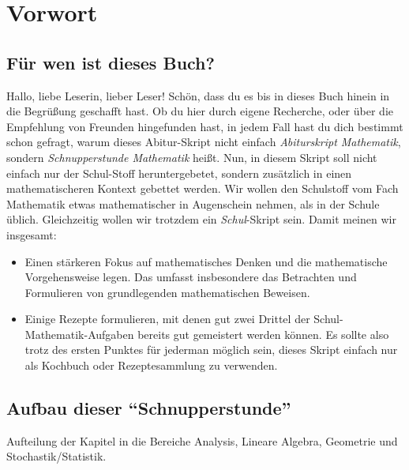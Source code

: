\chapter{Vorwort}

\section{Für wen ist dieses Buch?}
Hallo, liebe Leserin, lieber Leser! Schön, dass du es bis in dieses Buch hinein in die Begrüßung geschafft hast. Ob du hier durch eigene Recherche, oder über die Empfehlung von Freunden hingefunden hast, in jedem Fall hast du dich bestimmt schon gefragt, warum dieses Abitur-Skript nicht einfach \textit{Abiturskript Mathematik}, sondern \textit{Schnupperstunde Mathematik} heißt. Nun, in diesem Skript soll nicht einfach nur der Schul-Stoff heruntergebetet, sondern zusätzlich in einen mathematischeren Kontext gebettet werden. Wir wollen den Schulstoff vom Fach Mathematik etwas mathematischer in Augenschein nehmen, als in der Schule üblich. Gleichzeitig wollen wir trotzdem ein \textit{Schul}-Skript sein. Damit meinen wir insgesamt: 
\begin{itemize}
    \item Einen stärkeren Fokus auf mathematisches Denken und die mathematische Vorgehensweise legen. Das umfasst insbesondere das Betrachten und Formulieren von grundlegenden mathematischen Beweisen. 
    \item Einige Rezepte formulieren, mit denen gut zwei Drittel der Schul-Mathematik-Aufgaben bereits gut gemeistert werden können. Es sollte also trotz des ersten Punktes für jederman möglich sein, dieses Skript einfach nur als Kochbuch oder Rezeptesammlung zu verwenden. 
\end{itemize}

\section{Aufbau dieser "`Schnupperstunde"'}
Aufteilung der Kapitel in die Bereiche Analysis, Lineare Algebra, Geometrie und Stochastik/Statistik. 

